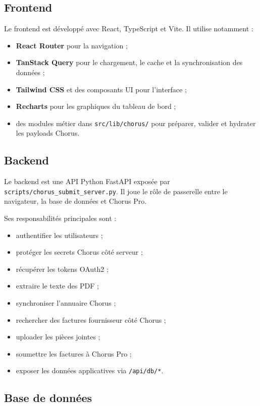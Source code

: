 \documentclass[11pt,a4paper]{article}
\begin{document}
\subsection{Frontend}

Le frontend est développé avec React, TypeScript et Vite. Il utilise notamment :

\begin{itemize}
  \item \textbf{React Router} pour la navigation ;
  \item \textbf{TanStack Query} pour le chargement, le cache et la synchronisation
        des données ;
  \item \textbf{Tailwind CSS} et des composants UI pour l'interface ;
  \item \textbf{Recharts} pour les graphiques du tableau de bord ;
  \item des modules métier dans \texttt{src/lib/chorus/} pour préparer, valider
        et hydrater les payloads Chorus.
\end{itemize}

\subsection{Backend}

Le backend est une API Python FastAPI exposée par
\texttt{scripts/chorus\_submit\_server.py}. Il joue le rôle de passerelle entre le
navigateur, la base de données et Chorus Pro.

Ses responsabilités principales sont :

\begin{itemize}
  \item authentifier les utilisateurs ;
  \item protéger les secrets Chorus côté serveur ;
  \item récupérer les tokens OAuth2 ;
  \item extraire le texte des PDF ;
  \item synchroniser l'annuaire Chorus ;
  \item rechercher des factures fournisseur côté Chorus ;
  \item uploader les pièces jointes ;
  \item soumettre les factures à Chorus Pro ;
  \item exposer les données applicatives via \texttt{/api/db/*}.
\end{itemize}

\subsection{Base de données}
\end{document}
